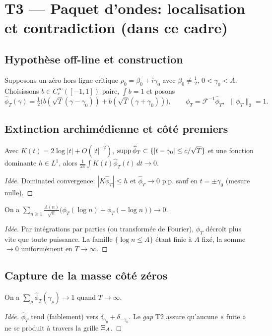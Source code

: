 \documentclass[11pt,a4paper]{proofarticle}
\begin{document}
\section{T3 — Paquet d’ondes: localisation et contradiction (dans ce cadre)}
\subsection{Hypothèse off-line et construction}
Supposons un zéro hors ligne critique $\rho_0=\beta_0+i\gamma_0$ avec $\beta_0\ne \frac12$, $0<\gamma_0<A$.
Choisissons $b\in C_c^\infty([-1,1])$ paire, $\int b=1$ et posons
\[
\widehat\phi_T(\gamma)=\tfrac12\Big(b(\sqrt{T}(\gamma-\gamma_0))+b(\sqrt{T}(\gamma+\gamma_0))\Big),\qquad
\phi_T=\mathcal{F}^{-1}\widehat\phi_T,\ \ \|\phi_T\|_2=1.
\]

\subsection{Extinction archimédienne et côté premiers}
\begin{lemma}[Archimédien $\to 0$]\label{lem:arch}
Avec $K(t)=2\log|t|+O(|t|^{-2})$, $\operatorname{supp} \widehat\phi_T\subset\{|t-\gamma_0|\le c/\sqrt{T}\}$ et une fonction dominante
$h\in L^1$, alors $\frac{1}{2\pi}\int K(t)\widehat\phi_T(t)\,dt\to 0$.
\end{lemma}
\begin{proof}[Idée]
Dominated convergence: $|K\widehat\phi_T|\le h$ et $\widehat\phi_T\to 0$ p.p. sauf en $t=\pm\gamma_0$ (mesure nulle).
\end{proof}

\begin{lemma}\label{lem:primes}
On a $\sum_{n\ge 1}\frac{\Lambda(n)}{\sqrt n}\big(\phi_T(\log n)+\phi_T(-\log n)\big)\to 0$.
\end{lemma}
\begin{proof}[Idée]
Par intégrations par parties (ou transformée de Fourier), $\phi_T$ décroît plus vite que toute puissance.
La famille $\{\log n\le A\}$ étant finie à $A$ fixé, la somme $\to 0$ uniformément en $T\to\infty$.
\end{proof}

\subsection{Capture de la masse côté zéros}
\begin{lemma}[Capture]\label{lem:capture}
On a $\sum_{\rho}\widehat\phi_T(\gamma_\rho)\to 1$ quand $T\to\infty$.
\end{lemma}
\begin{proof}[Idée]
$\widehat\phi_T$ tend (faiblement) vers $\delta_{\gamma_0}+\delta_{-\gamma_0}$.
Le \emph{gap} T2 assure qu’aucune « fuite » ne se produit à travers la grille $\Xi_A$.
\end{proof}
\end{document}
